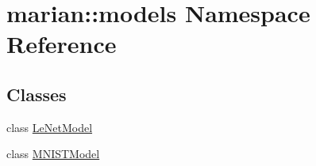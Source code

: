 \hypertarget{namespacemarian_1_1models}{}\section{marian\+:\+:models Namespace Reference}
\label{namespacemarian_1_1models}
\subsection*{Classes}
\begin{DoxyCompactItemize}
\item 
class \hyperlink{classmarian_1_1models_1_1LeNetModel}{Le\+Net\+Model}
\item 
class \hyperlink{classmarian_1_1models_1_1MNISTModel}{M\+N\+I\+S\+T\+Model}
\end{DoxyCompactItemize}
